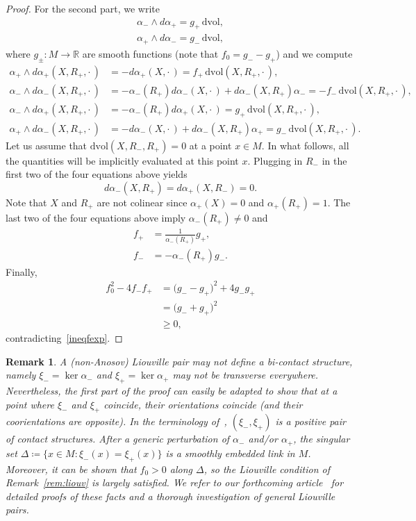 \documentclass[letterpaper, 11pt]{article}
\numberwithin{equation}{section}
\newtheorem{rem}[thm]{Remark}
\newcommand{\R}{\mathbb{R}}
\begin{document}
\begin{proof}
For the second part, we write
\begin{align*}
\alpha_- \wedge d\alpha_+ = g_+ \, \mathrm{dvol}, \\
\alpha_+ \wedge d\alpha_- = g_- \, \mathrm{dvol},
\end{align*}
where $g_\pm : M \rightarrow \R$ are smooth functions (note that $f_0 = g_- - g_+$) and we compute
\begin{align*}
\alpha_+ \wedge d\alpha_+ (X,R_+,\cdot\, ) &= -d\alpha_+(X,\cdot\, ) = f_+\, \mathrm{dvol}(X,R_+, \cdot\, ), \\
\alpha_- \wedge d\alpha_- (X,R_+, \cdot\, ) &= -\alpha_-(R_+) d\alpha_-(X,\cdot\, ) + d\alpha_-(X, R_+)\alpha_-  = -f_-\, \mathrm{dvol}(X,R_+, \cdot\, ),\\
\alpha_- \wedge d\alpha_+ (X,R_+, \cdot\, ) &= - \alpha_-(R_+) d\alpha_+(X, \cdot\, ) = g_+\,  \mathrm{dvol}(X, R_+, \cdot\, ),\\
\alpha_+ \wedge d\alpha_- (X, R_+, \cdot\, ) &=  - d\alpha_-(X,\cdot\, ) + d\alpha_-(X, R_+) \alpha_+  = g_-\, \mathrm{dvol}(X, R_+, \cdot\, ).
\end{align*}
Let us assume that $\mathrm{dvol}(X, R_-, R_+)=0$ at a point $x \in M$. In what follows, all the quantities will be implicitly evaluated at this point $x$. Plugging in $R_-$ in the first two of the four equations above yields $$d\alpha_-(X,R_+) = d\alpha_+(X, R_-) = 0.$$
Note that $X$ and $R_+$ are not colinear since $\alpha_+(X)=0$ and $\alpha_+(R_+)=1$. The last two of the four equations above imply $\alpha_-(R_+) \neq 0$ and 
\begin{align*}
f_+ &= \frac{1}{\alpha_-(R_+)} g_+, \\
f_- &= -\alpha_-(R_+) g_-.
\end{align*}
Finally, 
\begin{align*}
f_0^2 - 4 f_- f_+ &= \big(g_- - g_+ \big)^2 + 4 g_-g_+ \\
&= \big(g_- + g_+\big)^2 \\
&\geq 0,
\end{align*}
contradicting~\eqref{ineqfexp}.
\end{proof}

\begin{rem} \label{rem:positiv}
A (non-Anosov) Liouville pair may not define a bi-contact structure, namely $\xi_-=\ker \alpha_-$ and $\xi_+ = \ker \alpha_+$ may not be transverse everywhere. Nevertheless, the first part of the proof can easily be adapted to show that at a point where $\xi_-$ and $\xi_+$ coincide, their orientations coincide (and their coorientations are opposite). In the terminology of~\cite{CS11}, $(\xi_-, \xi_+)$ is a \emph{positive pair} of contact structures. After a generic perturbation of $\alpha_-$ and/or $\alpha_+$, the singular set $\Delta \coloneqq \{ x \in M : \xi_-(x) = \xi_+(x)\}$ is a smoothly embedded link in $M$. Moreover, it can be shown that $f_0 > 0$ along $\Delta$, so the Liouville condition of Remark~\ref{rem:liouv} is largely satisfied. We refer to our forthcoming article~\cite{Mas} for detailed proofs of these facts and a thorough investigation of general Liouville pairs.
\end{rem}
\end{document}
